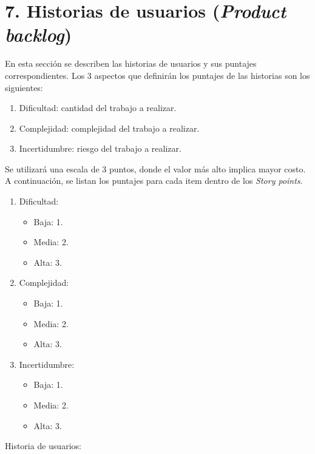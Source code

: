 \documentclass[
11pt, %
]{charter}
\begin{document}
\section{7. Historias de usuarios (\textit{Product backlog})}
\label{sec:backlog}

En esta sección se describen las historias de usuarios y sus puntajes correspondientes. Los 3 aspectos que definirán los puntajes de las historias son los siguientes:

\begin{enumerate}
\item Dificultad: cantidad del trabajo a realizar.
\item Complejidad: complejidad del trabajo a realizar.
\item Incertidumbre: riesgo del trabajo a realizar.
\end{enumerate}

Se utilizará una escala de 3 puntos, donde el valor más alto implica mayor costo. A continuación, se listan los puntajes para cada item dentro de los \textit{Story points}.

\begin{enumerate}
\item Dificultad:
\begin{itemize}
	\item Baja: 1.
	\item Media: 2.
	\item Alta: 3.
\end{itemize}
\item Complejidad:
\begin{itemize}
	\item Baja: 1.
	\item Media: 2.
	\item Alta: 3.
\end{itemize}
\item Incertidumbre:
\begin{itemize}
	\item Baja: 1.
	\item Media: 2.
	\item Alta: 3.
\end{itemize}
\end{enumerate}

Historia de usuarios:
\end{document}

